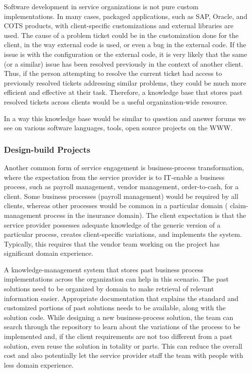 Software development in service organizations is not pure custom
implementations. In many cases, packaged applications, such as SAP, Oracle, and
COTS products, with client-specific customizations and external libraries are
used. The cause of a problem ticket could be in the customization done for the
client, in the way external code is used, or even a bug in the external code. If
the issue is with the configuration or the external code, it is very likely that
the same (or a similar) issue has been resolved previously in the context of
another client. Thus, if the person attempting to resolve the current ticket had
access to previously resolved tickets addressing similar problems, they could be
much more efficient and effective at their task.  Therefore, a knowledge base
that stores past resolved tickets across clients would be a useful
organization-wide resource. 

In a way this knowledge base would be similar to question and answer forums we see on various software languages, tools, open source projects on the WWW. 

\subsubsection{Design-build Projects}

Another common form of service engagement is business-process transformation,
where the expectation from the service provider is to IT-enable a business
process, such as payroll management, vendor management, order-to-cash, for a
client. Some business processes (\eg payroll management) would be required by
all clients, whereas other processes would be common in a particular domain (\eg
claim-management process in the insurance domain).  The client expectation is
that the service provider possesses adequate knowledge of the generic version of
a particular process, creates client-specific variations, and implements the
system. Typically, this requires that the vendor team working on the project has
significant domain experience.

A knowledge-management system that stores past business process implementations
across the organization can help in this scenario. The past solutions need to be
organized by domain to make retrieval of relevant information
easier. Appropriate documentation that explains the standard and customized
portions of past solutions needs to be available, along with the solution
code. While designing a new business-process solution, the team can search
through the repository to learn about the variations of the process to be
implemented and, if the client requirements are not too different from a past
solution, even reuse the solution in totality or parts. This can reduce the
overall cost and also potentially let the service provider staff the team with
people with less domain experience. 

